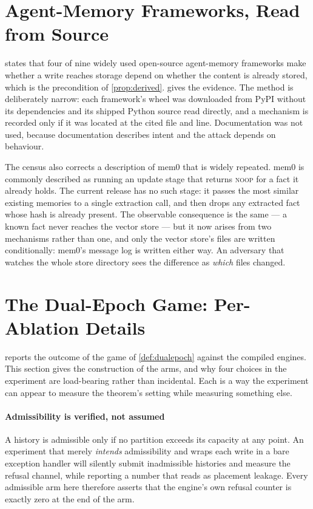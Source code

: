 \documentclass[10pt,journal,compsoc]{IEEEtran}
\begin{document}
\section{Agent-Memory Frameworks, Read from Source}
\label{supp:census}

 states that four of nine widely used open-source agent-memory
frameworks make whether a write reaches storage depend on whether the content is already stored,
which is the precondition of \cref{prop:derived}.  gives the evidence. The
method is deliberately narrow: each framework's wheel was downloaded from PyPI without its
dependencies and its shipped Python source read directly, and a mechanism is recorded only if it
was located at the cited file and line. Documentation was not used, because documentation
describes intent and the attack depends on behaviour.

The census also corrects a description of mem0 that is widely repeated. mem0 is commonly described as running an update stage that returns
\textsc{noop} for a fact it already holds. The current release has no such stage: it passes the
most similar existing memories to a single extraction call, and then drops any extracted fact
whose hash is already present. The observable consequence is the same --- a known fact never
reaches the vector store --- but it now arises from two mechanisms rather than one, and only the
vector store's files are written conditionally: mem0's message log is written either way. An
adversary that watches the whole store directory sees the difference as \emph{which} files
changed.



\section{The Dual-Epoch Game: Per-Ablation Details}
\label{supp:ablations}

 reports the outcome of the game of \cref{def:dualepoch} against the compiled
engines. This section gives the construction of the arms, and why four choices in the experiment are
load-bearing rather than incidental. Each is a way the experiment can appear to measure the
theorem's setting while measuring something else.

\paragraph{Admissibility is verified, not assumed} A history is admissible only if no partition
exceeds its capacity at any point. An experiment that merely \emph{intends} admissibility and wraps
each write in a bare exception handler will silently submit inadmissible histories and measure the
refusal channel, while reporting a number that reads as placement leakage. Every admissible arm here
therefore asserts that the engine's own refusal counter is exactly zero at the end of the arm.
\end{document}
